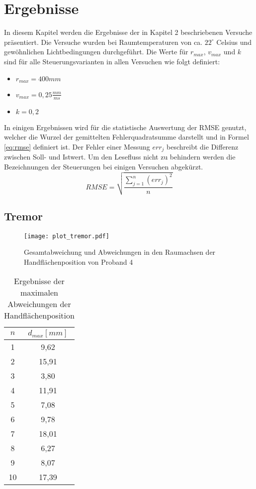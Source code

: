\chapter{Ergebnisse}
In diesem Kapitel werden die Ergebnisse der in Kapitel 2 beschriebenen Versuche präsentiert. Die Versuche wurden bei Raumtemperaturen von ca. $22^{\circ}$ Celsius und gewöhnlichen Lichtbedingungen durchgeführt. Die Werte für $r_{max}$, $v_{max}$ und $k$ sind für alle Steuerungsvarianten in allen Versuchen wie folgt definiert:
\begin{itemize}
	\item
	$r_{max} = 400 mm$
	\item
	$v_{max} = 0,25 \frac{mm}{ms}$
	\item
	$k = 0,2$
\end{itemize}

In einigen Ergebnissen wird für die statistische Auswertung der RMSE genutzt, welcher die Wurzel der gemittelten Fehlerquadratsumme darstellt und in Formel \ref{eq:rmse} definiert ist. Der Fehler einer Messung $err_j$ beschreibt die Differenz zwischen Soll- und Istwert. Um den Lesefluss nicht zu behindern werden die Bezeichnungen der Steuerungen bei einigen Versuchen abgekürzt.
\begin{equation}\label{eq:rmse}
RMSE=\sqrt{\frac{\sum_{j=1}^{n}\left(err_j\right)^2}{n}}
\end{equation}

\section{Tremor}

\begin{figure}[htb]
	\centering
	\texttt{[image: plot\_tremor.pdf]}
	\caption[Tremor-Test Proband 4]{Gesamtabweichung und Abweichungen in den Raumachsen der Handflächenposition von Proband 4}
	\label{fig:Plot Tremor}
\end{figure}

\begin{table}[htb]
	\caption{Ergebnisse der maximalen Abweichungen der Handflächenposition}
	\label{table tremor}
	\begin{center}
		\begin{tabular}{|c|c|}
			\hline 
			$n$ & $d_{max}[mm]$ \\ 
			\hline 
			1 & 9,62 \\ 
			\hline 
			2 & 15,91 \\ 
			\hline 
			3 & 3,80 \\ 
			\hline 
			4 & 11,91 \\ 
			\hline 
			5 & 7,08 \\ 
			\hline 
			6 & 9,78 \\ 
			\hline 
			7 & 18,01 \\ 
			\hline 
			8 & 6,27 \\ 
			\hline 
			9 & 8,07 \\ 
			\hline 
			10 & 17,39 \\ 
			\hline 
		\end{tabular} 
	\end{center}
\end{table}


